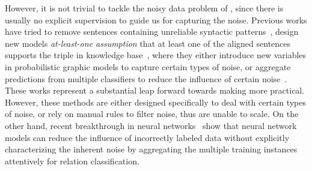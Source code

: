 However, it is not trivial to tackle the noisy data problem of \DS, since there is usually no explicit supervision to guide us for capturing the noise.
Previous works have tried to remove sentences containing unreliable syntactic patterns~\cite{takamatsu2012reducing}, design new models  
\textit{at-least-one assumption}
that at least one of the aligned sentences supports the triple in knowledge base~\cite{riedel2010modeling}, where they either introduce new variables in probabilistic graphic models to capture certain types of noise, or aggregate predictions from multiple classifiers to reduce the influence of certain noise~\cite{hoffmann2011knowledge,surdeanu2012multi,ritter2013modeling,min2013distant}. These works represent a substantial leap forward towards making \DS more practical. However, these methods are either designed specifically to deal with certain types of noise, 
or rely on manual rules to filter noise, thus are unable to scale.
On the other hand, recent breakthrough in neural networks~\cite{lin2016neural} show that neural network models can reduce the influence of incorrectly labeled data without explicitly characterizing the inherent noise by aggregating the multiple training instances attentively for relation classification.



